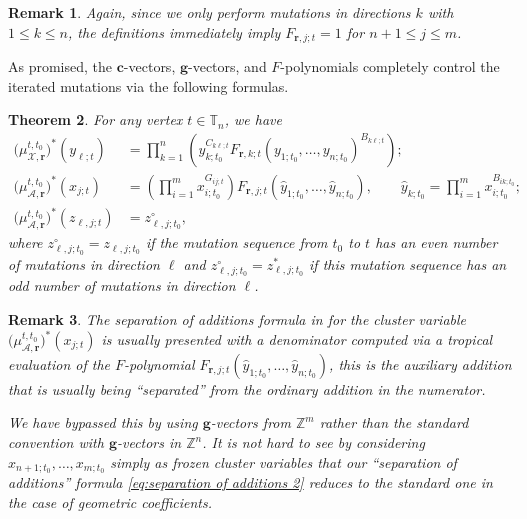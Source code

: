 \documentclass{amsart}
\newtheorem{theorem}{Theorem}[section]
\newtheorem{remark}[theorem]{Remark}
\numberwithin{equation}{section}
\newcommand{\bfc}{\mathbf{c}}
\newcommand{\bfg}{\mathbf{g}}
\newcommand{\bfr}{{\boldsymbol{r}}}
\newcommand{\cA}{\mathcal{A}}
\newcommand{\cX}{\mathcal{X}}
\newcommand{\TT}{\mathbb{T}}
\newcommand{\ZZ}{\mathbb{Z}}
\begin{document}
\begin{remark}
  Again, since we only perform mutations in directions $k$ with $1\le k\le n$, the definitions immediately imply $F_{\bfr,j;t}=1$ for $n+1\le j\le m$.
\end{remark}
As promised, the $\bfc$-vectors, $\bfg$-vectors, and $F$-polynomials completely control the iterated mutations via the following formulas.
\begin{theorem}
  \label{th:separation}
  \cite{FZ07,Nak15,NR16}
  For any vertex $t\in\TT_n$, we have
  \begin{align}
    \label{eq:separation of additions 1}
    \big(\mu_{\cX,\bfr}^{t,t_0}\big)^*(y_{\ell;t})&=\prod_{k=1}^n \left( y_{k;t_0}^{C_{k\ell;t}} F_{\bfr,k;t}(y_{1;t_0},\ldots,y_{n;t_0})^{B_{k\ell;t}} \right);\\
    \label{eq:separation of additions 2}
    \big(\mu_{\cA,\bfr}^{t,t_0}\big)^*(x_{j;t})&=\left(\prod_{i=1}^m x_{i;t_0}^{G_{ij;t}}\right) F_{\bfr,j;t}(\hat y_{1;t_0},\ldots,\hat y_{n;t_0}),\qquad \hat y_{k;t_0}=\prod_{i=1}^m x_{i;t_0}^{B_{ik;t_0}};\\
    \big(\mu_{\cA,\bfr}^{t,t_0}\big)^*(z_{\ell,j;t})&=z^\circ_{\ell,j;t_0},
  \end{align}
  where $z^\circ_{\ell,j;t_0}=z_{\ell,j;t_0}$ if the mutation sequence from $t_0$ to $t$ has an even number of mutations in direction $\ell$ and $z^\circ_{\ell,j;t_0}=z^*_{\ell,j;t_0}$ if this mutation sequence has an odd number of mutations in direction $\ell$.
\end{theorem}
\begin{remark}
  The separation of additions formula in \cite{FZ07} for the cluster variable $\big(\mu_{\cA,\bfr}^{t,t_0}\big)^*(x_{j;t})$ is usually presented with a denominator computed via a tropical evaluation of the $F$-polynomial $F_{\bfr,j;t}(\hat y_{1;t_0},\ldots,\hat y_{n;t_0})$, this is the auxiliary addition that is usually being ``separated'' from the ordinary addition in the numerator.

  We have bypassed this by using $\bfg$-vectors from $\ZZ^m$ rather than the standard convention with $\bfg$-vectors in $\ZZ^n$.
  It is not hard to see by considering $x_{n+1;t_0}, \ldots, x_{m;t_0}$ simply as frozen cluster variables that our ``separation of additions'' formula \eqref{eq:separation of additions 2} reduces to the standard one in the case of geometric coefficients.
\end{remark}
\end{document}
